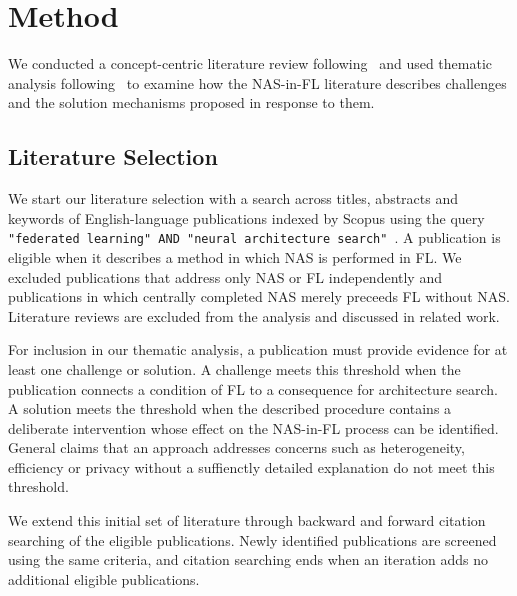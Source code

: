 \chapter{Method}\label{chapter:method}

We conducted a concept-centric literature review following~\cite{webster_watson_literature_review_2002} and used thematic analysis following~\cite{using_thematic_analysis_2006} to examine how the NAS-in-FL literature describes challenges and the solution mechanisms proposed in response to them.

\section{Literature Selection}

We start our literature selection with a search across titles, abstracts and keywords of English-language publications indexed by Scopus using the query \texttt{"federated learning" AND "neural architecture search"}~\cite{scopus}. A publication is eligible when it describes a method in which NAS is performed in FL. We excluded publications that address only NAS or FL independently and publications in which centrally completed NAS merely preceeds FL without NAS. Literature reviews are excluded from the analysis and discussed in related work.

For inclusion in our thematic analysis, a publication must provide evidence for at least one challenge or solution. A challenge meets this threshold when the publication connects a condition of FL to a consequence for architecture search. A solution meets the threshold when the described procedure contains a deliberate intervention whose effect on the NAS-in-FL process can be identified. General claims that an approach addresses concerns such as heterogeneity, efficiency or privacy without a suffienctly detailed explanation do not meet this threshold.

We extend this initial set of literature through backward and forward citation searching of the eligible publications. Newly identified publications are screened using the same criteria, and citation searching ends when an iteration adds no additional eligible publications.

